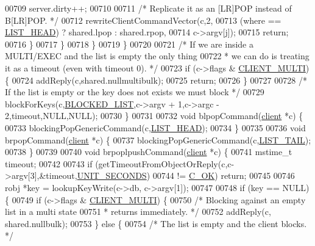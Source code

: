 \begin{DoxyCode}
00709                     server.dirty++;
00710 
00711                     \textcolor{comment}{/* Replicate it as an [LR]POP instead of B[LR]POP. */}
00712                     rewriteClientCommandVector(c,2,
00713                         (where == \hyperlink{server_8h_a5fc6a15ca26c6208f66ad2768a3108ef}{LIST\_HEAD}) ? shared.lpop : shared.rpop,
00714                         c->argv[j]);
00715                     \textcolor{keywordflow}{return};
00716                 \}
00717             \}
00718         \}
00719     \}
00720 
00721     \textcolor{comment}{/* If we are inside a MULTI/EXEC and the list is empty the only thing}
00722 \textcolor{comment}{     * we can do is treating it as a timeout (even with timeout 0). */}
00723     \textcolor{keywordflow}{if} (c->flags & \hyperlink{server_8h_a7f61f783f429419f8c593291a509b03a}{CLIENT\_MULTI}) \{
00724         addReply(c,shared.nullmultibulk);
00725         \textcolor{keywordflow}{return};
00726     \}
00727 
00728     \textcolor{comment}{/* If the list is empty or the key does not exists we must block */}
00729     blockForKeys(c,\hyperlink{server_8h_a279f6a31729ba24d6dab0944b82e0b55}{BLOCKED\_LIST},c->argv + 1,c->argc - 2,timeout,NULL,NULL);
00730 \}
00731 
00732 \textcolor{keywordtype}{void} blpopCommand(\hyperlink{structclient}{client} *c) \{
00733     blockingPopGenericCommand(c,\hyperlink{server_8h_a5fc6a15ca26c6208f66ad2768a3108ef}{LIST\_HEAD});
00734 \}
00735 
00736 \textcolor{keywordtype}{void} brpopCommand(\hyperlink{structclient}{client} *c) \{
00737     blockingPopGenericCommand(c,\hyperlink{server_8h_a745de98bef5b645df56479181803235b}{LIST\_TAIL});
00738 \}
00739 
00740 \textcolor{keywordtype}{void} brpoplpushCommand(\hyperlink{structclient}{client} *c) \{
00741     mstime\_t timeout;
00742 
00743     \textcolor{keywordflow}{if} (getTimeoutFromObjectOrReply(c,c->argv[3],&timeout,\hyperlink{server_8h_a8553b0a6c729b15594731a0d37b4fb0d}{UNIT\_SECONDS})
00744         != \hyperlink{server_8h_a303769ef1065076e68731584e758d3e1}{C\_OK}) \textcolor{keywordflow}{return};
00745 
00746     robj *key = lookupKeyWrite(c->db, c->argv[1]);
00747 
00748     \textcolor{keywordflow}{if} (key == NULL) \{
00749         \textcolor{keywordflow}{if} (c->flags & \hyperlink{server_8h_a7f61f783f429419f8c593291a509b03a}{CLIENT\_MULTI}) \{
00750             \textcolor{comment}{/* Blocking against an empty list in a multi state}
00751 \textcolor{comment}{             * returns immediately. */}
00752             addReply(c, shared.nullbulk);
00753         \} \textcolor{keywordflow}{else} \{
00754             \textcolor{comment}{/* The list is empty and the client blocks. */}

\end{DoxyCode}
